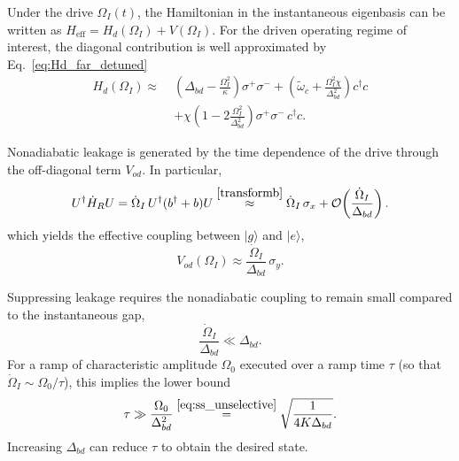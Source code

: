 Under the drive $\Omega_I(t)$, the Hamiltonian in the instantaneous eigenbasis can be written as
$H_{\mathrm{eff}} = H_d(\Omega_I) + V(\Omega_I)$.
For the driven operating regime of interest, the diagonal contribution is well approximated by Eq.\ \eqref{eq:Hd_far_detuned}
\begin{equation}
\begin{aligned}
H_d(\Omega_I) \approx\;&
\left( \Delta_{bd} - \frac{\Omega_I^2}{\kappa} \right) \sigma^+ \sigma^-
+ \left( \tilde{\omega}_c + \frac{\Omega_I^2 \chi}{\Delta_{bd}^2} \right) c^\dagger c \\
&+ \chi \left( 1 - 2 \frac{\Omega_I^2}{\Delta_{bd}^2} \right) \sigma^+ \sigma^-\, c^\dagger c .
\end{aligned}
\end{equation}

Nonadiabatic leakage is generated by the time dependence of the drive through the off-diagonal term $V_{od}$.
In particular,
\begin{equation}
U^\dagger \dot{H}_R U
= \dot{\Omega}_I\, U^\dagger (b^\dagger + b) U
\overset{\eqref{transformb}}{\approx} \dot{\Omega}_I\, \sigma_x
+ \mathcal{O}\!\left(\frac{\dot{\Omega}_I}{\Delta_{bd}}\right).
\end{equation}
which yields the effective coupling between $|g\rangle$ and $|e\rangle$,
\begin{equation}
V_{od}(\Omega_I) \approx \frac{\dot{\Omega}_I}{\Delta_{bd}}\, \sigma_y .
\end{equation}

Suppressing leakage requires the nonadiabatic coupling to remain small compared to the instantaneous gap,
\begin{equation}
\frac{\dot{\Omega}_I}{\Delta_{bd}} \ll \Delta_{bd}.
\end{equation}
For a ramp of characteristic amplitude $\Omega_0$ executed over a ramp time $\tau$ (so that $\dot{\Omega}_I \sim \Omega_0/\tau$), this implies the lower bound
\begin{equation}
\tau \gg \frac{\Omega_0}{\Delta_{bd}^2}\overset{\eqref{eq:ss_unselective}}{=}\sqrt{\frac{1}{4K\Delta_{bd}}}.
\end{equation}
Increasing $\Delta_{bd}$ can reduce $\tau$ to obtain the desired state.

